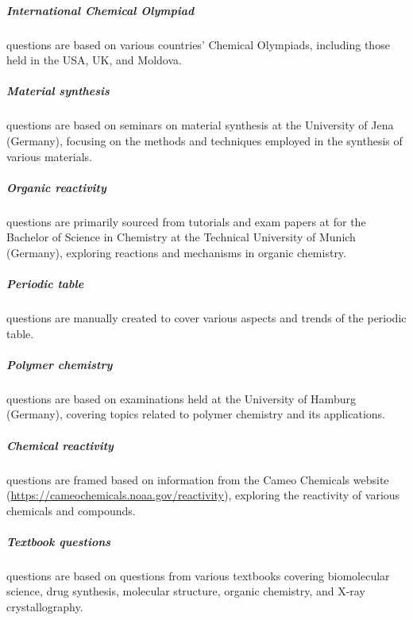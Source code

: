\documentclass[11pt, oneside]{article}
\begin{document}
\subparagraph{International Chemical Olympiad}
 questions are based on various countries' Chemical Olympiads, including those held in the USA, UK, and Moldova.

\subparagraph{Material synthesis}
 questions are based on seminars on material synthesis at the University of Jena (Germany), focusing on the methods and techniques employed in the synthesis of various materials.

\subparagraph{Organic reactivity}
  questions are primarily sourced from tutorials and exam papers at for the Bachelor of Science in Chemistry at the Technical University of Munich (Germany), exploring reactions and mechanisms in organic chemistry.

\subparagraph{Periodic table}
 questions are manually created to cover various aspects and trends of the periodic table.

\subparagraph{Polymer chemistry}
 questions are based on examinations held at the University of Hamburg (Germany), covering topics related to polymer chemistry and its applications.

\subparagraph{Chemical reactivity}
 questions are framed based on information from the Cameo Chemicals website (\url{https://cameochemicals.noaa.gov/reactivity}), exploring the reactivity of various chemicals and compounds.

\subparagraph{Textbook questions}
 questions are based on questions from various textbooks covering biomolecular science, drug synthesis, molecular structure, organic chemistry, and X-ray crystallography.
\end{document}
